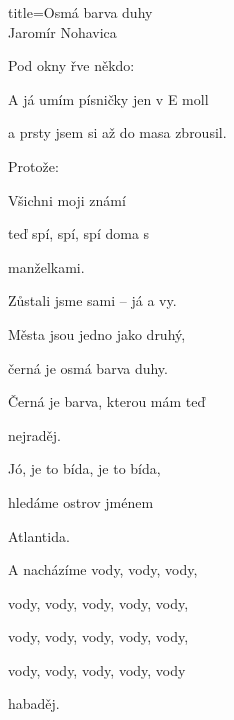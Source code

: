 \begin{song}{title=\predtitle\centering Osmá barva duhy \\\large Jaromír Nohavica  \vspace*{-0.3cm}}
{\begin{centerjustified}
\begin{varwidth}[t]{0.48\textwidth}
\sloka
	Pod okny řve někdo: 
	
	A já umím písničky jen v E moll
	
	a prsty jsem si až do masa zbrousil.
	
	Protože:
	

	Všichni moji známí
	
	teď spí, spí, spí doma s 

	manželkami.

	Zůstali jsme sami -- já a vy.
	
	Města jsou jedno jako druhý,
	
	černá je osmá barva duhy.
	
	Černá je barva, kterou mám teď 

	nejraděj.
	
	Jó, je to bída, je to bída,
	
	hledáme ostrov jménem 

	Atlantida.
	
	A nacházíme vody, vody, vody, 

	vody, vody, vody, vody, vody, 
	
	vody, vody, vody, vody, vody,

	vody, vody, vody, vody, vody

	habaděj. 

\end{varwidth}

\end{centerjustified}
}
\setcounter{Slokočet}{0}
\end{song}
